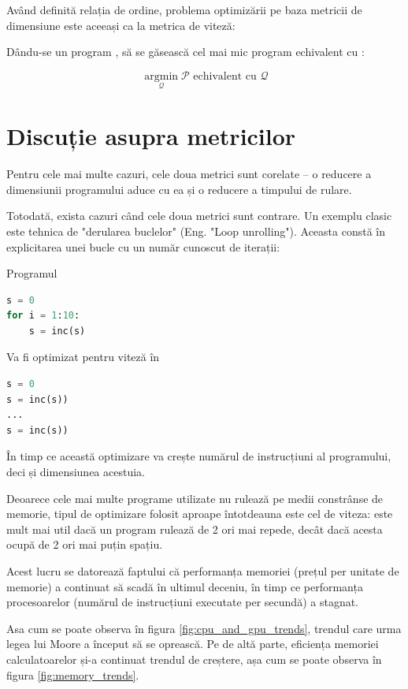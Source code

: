 Având definită relația de ordine, problema optimizării pe
baza metricii de dimensiune este aceeași ca la metrica de viteză:

Dându-se un program , să se găsească  cel mai mic
program echivalent cu :

\[
	\operatorname*{argmin}_\mathcal{Q} \mathcal{P}
	\text{ echivalent cu  } \mathcal{Q}
\]

\section{Discuție asupra metricilor}

Pentru cele mai multe cazuri, cele doua metrici sunt corelate --
o reducere a dimensiunii programului aduce cu ea și o reducere a timpului de rulare.

Totodată, exista cazuri când cele doua metrici sunt contrare.
Un exemplu clasic este tehnica de "derularea buclelor" (Eng. "Loop
unrolling").
Aceasta constă în explicitarea unei bucle cu un număr cunoscut
de iterații:

Programul
\begin{lstlisting}[language=Python]
s = 0
for i = 1:10:
    s = inc(s)
\end{lstlisting}

Va fi optimizat pentru viteză în
\begin{lstlisting}[language=Python]
s = 0
s = inc(s))
...
s = inc(s))
\end{lstlisting}

În timp ce această optimizare va crește numărul de instrucțiuni
al programului, deci și dimensiunea acestuia.

Deoarece cele mai multe programe utilizate nu rulează pe medii
constrânse de memorie, tipul de optimizare folosit aproape
întotdeauna este cel de viteza: este mult mai util dacă un
program rulează de 2 ori mai repede, decât dacă acesta ocupă de
2 ori mai puțin spațiu.

Acest lucru se datorează faptului că performanța memoriei (prețul
per unitate de memorie) a continuat să scadă în ultimul deceniu,
în timp ce performanța procesoarelor (numărul de instrucțiuni
executate per secundă) a stagnat.

Asa cum se poate observa în figura \ref{fig:cpu_and_gpu_trends},
trendul care urma legea lui Moore \cite{moores_law} a început să
se oprească. Pe de altă parte, eficiența memoriei calculatoarelor
și-a continuat trendul de creștere, așa cum se poate observa în figura
\ref{fig:memory_trends}.

